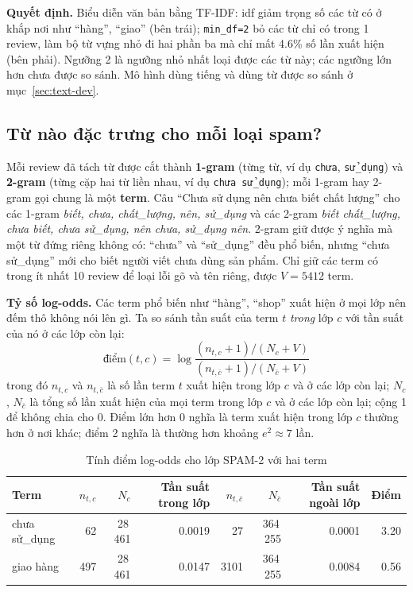 \textbf{Quyết định.} Biểu diễn văn bản bằng TF-IDF: idf giảm trọng số các từ có ở khắp nơi như ``hàng'', ``giao'' (bên trái); \texttt{min\_df=2}
bỏ các từ chỉ có trong 1 review, làm bộ từ vựng nhỏ đi hai phần ba mà chỉ mất 4.6\% số lần xuất hiện (bên phải). Ngưỡng 2 là ngưỡng nhỏ nhất
loại được các từ này; các ngưỡng lớn hơn chưa được so sánh. Mô hình dùng tiếng và dùng từ được so sánh ở mục~\ref{sec:text-dev}.

\subsection{Từ nào đặc trưng cho mỗi loại spam?}
\label{sec:text-logodds}
Mỗi review đã tách từ được cắt thành \textbf{1-gram} (từng từ, ví dụ \texttt{chưa}, \texttt{sử\_dụng}) và \textbf{2-gram} (từng cặp hai từ liền nhau,
ví dụ \texttt{chưa sử\_dụng}); mỗi 1-gram hay 2-gram gọi chung là một \textbf{term}. Câu ``Chưa sử dụng nên chưa biết chất lượng'' cho các 1-gram
\textit{biết, chưa, chất\_lượng, nên, sử\_dụng} và các 2-gram \textit{biết chất\_lượng, chưa biết, chưa sử\_dụng, nên chưa, sử\_dụng nên}.
2-gram giữ được ý nghĩa mà một từ đứng riêng không có: ``chưa'' và ``sử\_dụng'' đều phổ biến, nhưng ``chưa sử\_dụng'' mới cho biết người viết
chưa dùng sản phẩm. Chỉ giữ các term có trong ít nhất 10 review để loại lỗi gõ và tên riêng, được $V = 5412$ term.

\textbf{Tỷ số log-odds.} Các term phổ biến như ``hàng'', ``shop'' xuất hiện ở mọi lớp nên đếm thô không nói lên gì. Ta so sánh tần suất của
term $t$ \emph{trong} lớp $c$ với tần suất của nó ở các lớp còn lại:
\[
\text{điểm}(t, c) = \log\frac{(n_{t,c} + 1) / (N_c + V)}{(n_{t,\bar c} + 1) / (N_{\bar c} + V)}
\]
trong đó $n_{t,c}$ và $n_{t,\bar c}$ là số lần term $t$ xuất hiện trong lớp $c$ và ở các lớp còn lại; $N_c$, $N_{\bar c}$ là tổng số lần xuất hiện
của mọi term trong lớp $c$ và ở các lớp còn lại; cộng 1 để không chia cho 0. Điểm lớn hơn 0 nghĩa là term xuất hiện trong lớp $c$ thường hơn ở nơi khác;
điểm 2 nghĩa là thường hơn khoảng $e^2 \approx 7$ lần.

\begin{table}[H]
\centering
\caption{Tính điểm log-odds cho lớp SPAM-2 với hai term}
\label{tab:text-logodds}
\small
\begin{tabular}{lrrrrrrr}
\toprule
Term & $n_{t,c}$ & $N_c$ & Tần suất trong lớp & $n_{t,\bar c}$ & $N_{\bar c}$ & Tần suất ngoài lớp & Điểm\\
\midrule
chưa sử\_dụng & 62 & 28\,461 & 0.0019 & 27 & 364\,255 & 0.0001 & 3.20\\
giao hàng & 497 & 28\,461 & 0.0147 & 3101 & 364\,255 & 0.0084 & 0.56\\
\bottomrule
\end{tabular}
\end{table}

